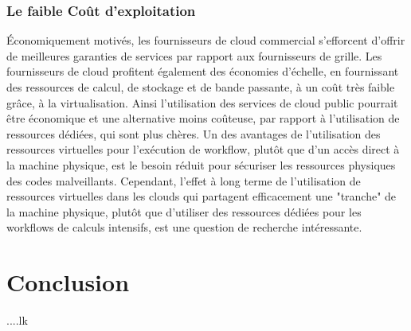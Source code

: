 \subsubsection{Le faible Coût d’exploitation }
 Économiquement motivés, les fournisseurs de cloud commercial s'efforcent d'offrir de meilleures garanties de services par rapport aux fournisseurs de grille. Les fournisseurs de cloud profitent également des économies d'échelle, en fournissant des ressources de calcul, de stockage et de bande passante, à un coût très faible grâce, à la virtualisation. Ainsi l'utilisation des services de cloud public pourrait être économique et une alternative moins coûteuse, par rapport à l’utilisation de ressources dédiées, qui sont plus chères. Un des avantages de l'utilisation des ressources virtuelles pour l'exécution de workflow, plutôt que d'un accès direct à la machine physique, est le besoin réduit pour sécuriser les ressources physiques des codes malveillants. Cependant, l'effet à long terme de l'utilisation de ressources virtuelles dans les clouds qui partagent efficacement une "tranche" de la machine physique, plutôt que d'utiliser des ressources dédiées pour les workflows de calculs intensifs, est une question de recherche intéressante. 
\section{Conclusion}
....lk
